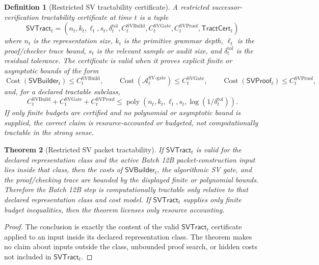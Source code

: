 \documentclass[11pt]{article}
\newtheorem{theorem}{Theorem}[section]
\newtheorem{definition}[theorem]{Definition}
\newcommand{\Acal}{\mathcal{A}}
\newcommand{\1}{\mathbf{1}}
\providecommand{\Cost}{\operatorname{Cost}}
\begin{document}
\begin{definition}[Restricted SV tractability certificate]
\label{def:batch12b_sv_tractability_certificate}
A restricted successor-verification tractability certificate at time \(t\) is a tuple
\[
\mathsf{SVTract}_t=(n_t,k_t,\ell_t,s_t,\delta_t^{\mathrm{tol}},C_t^{\mathrm{SVBuild}},C_t^{\mathrm{SVGate}},C_t^{\mathrm{SVProof}},\mathsf{TractCert}_t)
\]
where \(n_t\) is the representation size, \(k_t\) is the primitive grammar depth, \(\ell_t\) is the proof/checker trace bound, \(s_t\) is the relevant sample or audit size, and \(\delta_t^{\mathrm{tol}}\) is the residual tolerance.  The certificate is valid when it proves explicit finite or asymptotic bounds of the form
\[
\Cost(\mathsf{SVBuilder}_t)
\le
C_t^{\mathrm{SVBuild}},
\qquad
\Cost(\Acal_t^{\mathrm{SV\mbox{-}gate}})
\le
C_t^{\mathrm{SVGate}},
\qquad
\Cost(\mathsf{SVProof}_t)
\le
C_t^{\mathrm{SVProof}},
\]
and, for a declared tractable subclass,
\[
C_t^{\mathrm{SVBuild}}+C_t^{\mathrm{SVGate}}+C_t^{\mathrm{SVProof}}
\le
\operatorname{poly}(n_t,k_t,\ell_t,s_t,\log(1/\delta_t^{\mathrm{tol}})).
\]
If only finite budgets are certified and no polynomial or asymptotic bound is supplied, the correct claim is \emph{resource-accounted} or \emph{budgeted}, not computationally tractable in the strong sense.
\end{definition}

\begin{theorem}[Restricted SV packet tractability]
\label{thm:batch12b_restricted_sv_packet_tractability}
If \(\mathsf{SVTract}_t\) is valid for the declared representation class and the active Batch 12B packet-construction input lies inside that class, then the costs of \(\mathsf{SVBuilder}_t\), the algorithmic SV gate, and the proof/checking trace are bounded by the displayed finite or polynomial bounds.  Therefore the Batch 12B step is computationally tractable only relative to that declared representation class and cost model.  If \(\mathsf{SVTract}_t\) supplies only finite budget inequalities, then the theorem licenses only resource accounting.
\end{theorem}

\begin{proof}
The conclusion is exactly the content of the valid \(\mathsf{SVTract}_t\) certificate applied to an input inside its declared representation class.  The theorem makes no claim about inputs outside the class, unbounded proof search, or hidden costs not included in \(\mathsf{SVTract}_t\).
\end{proof}
\end{document}

